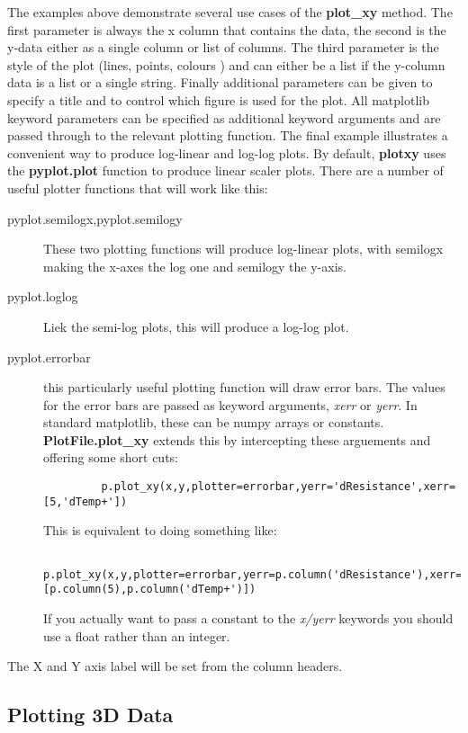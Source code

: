 \documentclass[a4paper,11pt]{scrartcl}
\begin{document}
The examples above demonstrate several use cases of the \textbf{plot\_xy} method. The first parameter is always the x column that contains the data, the second is the y-data either as a single column or list of columns. The third parameter is the style of the plot (lines, points, colours \etc) and can either be a list if the y-column data is a list or a single string. Finally additional parameters can be given to specify a title and to control which figure is used for the plot. All matplotlib keyword parameters can be specified as additional keyword arguments and are passed through to the relevant plotting function. The final example illustrates a convenient way to produce log-linear and log-log plots. By default, \textbf{plotxy} uses the \textbf{pyplot.plot} function to produce linear scaler plots. There are a number of useful plotter functions that will work like this:
\begin{description}
  \item[pyplot.semilogx,pyplot.semilogy] These two plotting functions will produce log-linear plots, with semilogx making the x-axes the log one and semilogy the y-axis.
  \item[pyplot.loglog] Liek the semi-log plots, this will produce a log-log plot.
  \item[pyplot.errorbar] this particularly useful plotting function will draw error bars. The values for the error bars are passed as keyword arguments, \textit{xerr} or \textit{yerr}. In standard matplotlib, these can be numpy arrays or constants. \textbf{PlotFile.plot\_xy} extends this by intercepting these arguements and offering some short cuts:
      \begin{lstlisting}
         p.plot_xy(x,y,plotter=errorbar,yerr='dResistance',xerr=[5,'dTemp+'])
      \end{lstlisting}
      This is equivalent to doing something like:
       \begin{lstlisting}
         p.plot_xy(x,y,plotter=errorbar,yerr=p.column('dResistance'),xerr=[p.column(5),p.column('dTemp+')])
      \end{lstlisting}
    If you actually want to pass a constant to the \textit{x/yerr} keywords you should use a float rather than an integer.
\end{description}

The X and Y axis label will be set from the column headers.

\subsection{Plotting 3D Data}
\end{document}
